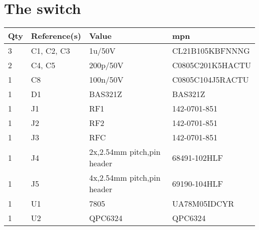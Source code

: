 \section{The switch}
\begin{center}
    \begin{tabular}{@{} llll @{}}
        \toprule
        Qty & Reference(s) & Value                      & \acrshort{mpn}   \\
        \midrule
        3   & C1, C2, C3   & 1u/50V                     & CL21B105KBFNNNG  \\
        2   & C4, C5       & 200p/50V                   & C0805C201K5HACTU \\
        1   & C8           & 100n/50V                   & C0805C104J5RACTU \\
        1   & D1           & BAS321Z                    & BAS321Z          \\
        1   & J1           & RF1                        & 142-0701-851     \\
        1   & J2           & RF2                        & 142-0701-851     \\
        1   & J3           & RFC                        & 142-0701-851     \\
        1   & J4           & 2x,2.54mm pitch,pin header & 68491-102HLF     \\
        1   & J5           & 4x,2.54mm pitch,pin header & 69190-104HLF     \\
        1   & U1           & 7805                       & UA78M05IDCYR     \\
        1   & U2           & QPC6324                    & QPC6324          \\
        \bottomrule
    \end{tabular}
\end{center}

\newpage
